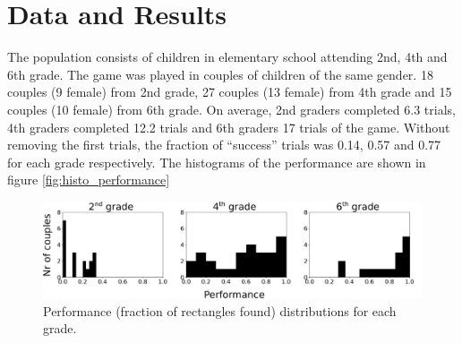 \documentclass[a4paper,10pt]{article}
\title{}
\author{}
\begin{document}
\maketitle

% 

\section{Data and Results}

The population consists of children in elementary school attending 2nd, 4th and 6th grade. The game was played in couples of children of the same gender. 18 couples (9 female) from 2nd grade, 27 couples (13 female) from 4th grade and 15 couples (10 female) from 6th grade. On average, 2nd graders completed 6.3 trials, 4th graders completed 12.2 trials and 6th graders 17 trials of the game. Without removing the first trials, the fraction of ``success'' trials was 0.14, 0.57  and 0.77 for each grade
respectively. The histograms of the performance are shown in figure \ref{fig:histo_performance}





\begin{figure}
    \centering
    \includegraphics[width=6.0in]{figures/performance_histograms.pdf}
    \caption{Performance (fraction of rectangles found) distributions for each grade.}
    \label{simulationfigure}
\end{figure}


\end{document}

